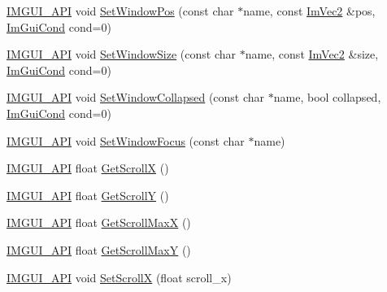 \begin{DoxyCompactItemize}
\item 
\mbox{\hyperlink{imgui_8h_a43829975e84e45d1149597467a14bbf5}{I\+M\+G\+U\+I\+\_\+\+A\+PI}} void \mbox{\hyperlink{namespace_im_gui_a32032b56f975bb3145adbe19f38f3b56}{Set\+Window\+Pos}} (const char $\ast$name, const \mbox{\hyperlink{struct_im_vec2}{Im\+Vec2}} \&pos, \mbox{\hyperlink{imgui_8h_aef890d6ac872e12c5804d0b3e4f7f103}{Im\+Gui\+Cond}} cond=0)
\item 
\mbox{\hyperlink{imgui_8h_a43829975e84e45d1149597467a14bbf5}{I\+M\+G\+U\+I\+\_\+\+A\+PI}} void \mbox{\hyperlink{namespace_im_gui_a441528b9198d4531e79337121212cd33}{Set\+Window\+Size}} (const char $\ast$name, const \mbox{\hyperlink{struct_im_vec2}{Im\+Vec2}} \&size, \mbox{\hyperlink{imgui_8h_aef890d6ac872e12c5804d0b3e4f7f103}{Im\+Gui\+Cond}} cond=0)
\item 
\mbox{\hyperlink{imgui_8h_a43829975e84e45d1149597467a14bbf5}{I\+M\+G\+U\+I\+\_\+\+A\+PI}} void \mbox{\hyperlink{namespace_im_gui_ac349187d6aae141cd3b4476e54bcc338}{Set\+Window\+Collapsed}} (const char $\ast$name, bool collapsed, \mbox{\hyperlink{imgui_8h_aef890d6ac872e12c5804d0b3e4f7f103}{Im\+Gui\+Cond}} cond=0)
\item 
\mbox{\hyperlink{imgui_8h_a43829975e84e45d1149597467a14bbf5}{I\+M\+G\+U\+I\+\_\+\+A\+PI}} void \mbox{\hyperlink{namespace_im_gui_aa612adbb975051090898f094a1608f24}{Set\+Window\+Focus}} (const char $\ast$name)
\item 
\mbox{\hyperlink{imgui_8h_a43829975e84e45d1149597467a14bbf5}{I\+M\+G\+U\+I\+\_\+\+A\+PI}} float \mbox{\hyperlink{namespace_im_gui_a6f88335d87da3be81dc6e24cb1812923}{Get\+ScrollX}} ()
\item 
\mbox{\hyperlink{imgui_8h_a43829975e84e45d1149597467a14bbf5}{I\+M\+G\+U\+I\+\_\+\+A\+PI}} float \mbox{\hyperlink{namespace_im_gui_a3c924a2eeb8b2ddfb40ea17be7ea12a6}{Get\+ScrollY}} ()
\item 
\mbox{\hyperlink{imgui_8h_a43829975e84e45d1149597467a14bbf5}{I\+M\+G\+U\+I\+\_\+\+A\+PI}} float \mbox{\hyperlink{namespace_im_gui_af472cb090157c22e65a0aa1662b9f3d0}{Get\+Scroll\+MaxX}} ()
\item 
\mbox{\hyperlink{imgui_8h_a43829975e84e45d1149597467a14bbf5}{I\+M\+G\+U\+I\+\_\+\+A\+PI}} float \mbox{\hyperlink{namespace_im_gui_ab34c0d5c63908a7ff50923151730f76a}{Get\+Scroll\+MaxY}} ()
\item 
\mbox{\hyperlink{imgui_8h_a43829975e84e45d1149597467a14bbf5}{I\+M\+G\+U\+I\+\_\+\+A\+PI}} void \mbox{\hyperlink{namespace_im_gui_a0796750de8c50555d895f63e79ac87f0}{Set\+ScrollX}} (float scroll\+\_\+x)
\item 

\end{DoxyCompactItemize}

